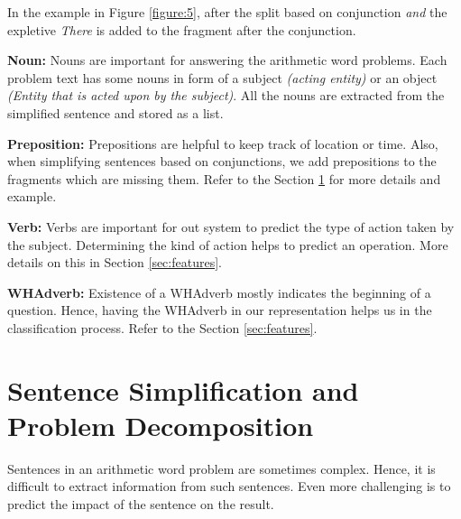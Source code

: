 \documentclass[11pt]{article}
\begin{document}
In the example in Figure \ref{figure:5}, after the split based on conjunction \textit{and} the expletive \textit{There} is added to the fragment after the conjunction.
\vspace{4mm}

\textbf{Noun:} Nouns are important for answering the arithmetic word problems. Each problem text has some nouns in form of a subject \textit{(acting entity)} or an object \textit{(Entity that is acted upon by the subject)}. All the nouns are extracted from the simplified sentence and stored as a list. 
\vspace{4mm}

\textbf{Preposition:} Prepositions are helpful to keep track of location or time. Also, when simplifying sentences based on conjunctions, we add prepositions to the fragments which are missing them. Refer to the Section \ref{sec:sentencesimplification} for more details and example.
\vspace{4mm}

\newpage

\textbf{Verb:} Verbs are important for out system to predict the type of action taken by the subject. Determining the kind of action helps to predict an operation. More details on this in Section \ref{sec:features}.
\vspace{4mm}

\textbf{WHAdverb:} Existence of a WHAdverb mostly indicates the beginning of a question. Hence, having the WHAdverb in our representation helps us in the classification process. Refer to the Section \ref{sec:features}.

\section{Sentence Simplification and Problem Decomposition} \label{sec:sentencesimplification}
Sentences in an arithmetic word problem are sometimes complex. Hence, it is difficult to extract information from such sentences. Even more challenging is to predict the impact of the sentence on the result. 
\end{document}
